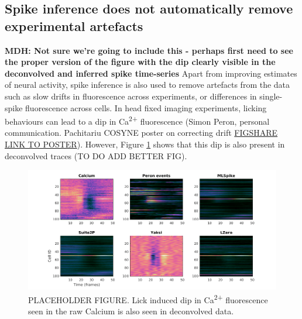 \documentclass[a4paper,10pt,twocolumn]{article}
\begin{document}
\subsection*{Spike inference does not automatically remove experimental artefacts}
\textbf{MDH: Not sure we're going to include this - perhaps first need to see the proper version of the figure with the dip clearly visible in the deconvolved and inferred spike time-series}
Apart from improving estimates of neural activity, spike inference is also used to remove artefacts from the data such as slow drifts in fluorescence across experiments, or differences in single-spike fluorescence across cells. In head fixed imaging experiments, licking behaviours can lead to a dip in Ca\textsuperscript{2+} fluorescence (Simon Peron, personal communication. Pachitariu COSYNE poster on correcting drift {\href{https://figshare.com/articles/Drift_correction_for_electrophysiology_and_two-photon_calcium_imaging/5946574}{{\color{blue} FIGSHARE LINK TO POSTER}}}). However, Figure \ref{fig:lick_PSTH} shows that this dip is also present in deconvolved traces (TO DO ADD BETTER FIG).

\begin{figure}[H]
\includegraphics[width=\textwidth]{psth2_1260.png}
\caption{\label{fig:lick_PSTH} PLACEHOLDER FIGURE. Lick induced dip in Ca\textsuperscript{2+} fluorescence seen in the raw Calcium is also seen in deconvolved data.}
\end{figure}

\end{document}

